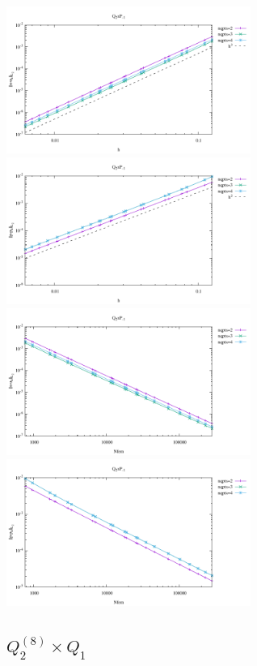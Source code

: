 \begin{center}
\includegraphics[width=8cm]{python_codes/fieldstone_120/results/Q2Pm1-velocity-h.pdf}
\includegraphics[width=8cm]{python_codes/fieldstone_120/results/Q2Pm1-pressure-h.pdf}\\
\includegraphics[width=8cm]{python_codes/fieldstone_120/results/Q2Pm1-velocity-Nfem.pdf}
\includegraphics[width=8cm]{python_codes/fieldstone_120/results/Q2Pm1-pressure-Nfem.pdf}
\end{center}

\subsection*{$Q_2^{(8)}\times Q_1$}

